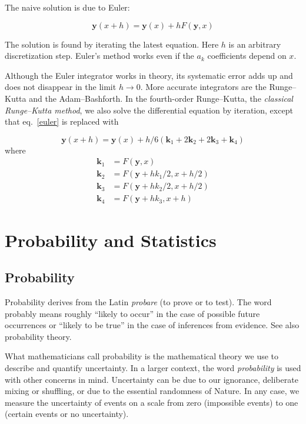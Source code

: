 \documentclass[justified,sixbynine]{tufte-book}
\theoremstyle{plain}%
\theoremstyle{definition}
\theoremstyle{remark}
\begin{document}
\begin{fullwidth}
The naive solution is due to Euler:

\begin{equation}
\mathbf{y}(x+h) = \mathbf{y}(x) + hF(\mathbf{y},x)\label{euler}
\end{equation}

The solution is found by iterating the latest equation. Here $h$ is an arbitrary discretization step. Euler's method works even if the $a_k$ coefficients depend on $x$.

 Although the Euler integrator works in theory, its systematic error adds up and does not disappear in the limit $h\rightarrow 0$. More accurate integrators are the Runge--Kutta and the Adam--Bashforth. In the fourth-order Runge--Kutta, the {\it classical Runge--Kutta method}, we also solve the differential equation by iteration, except that eq.~\ref{euler} is replaced with

\begin{equation}
\mathbf{y}(x+h) = \mathbf{y}(x) + h/6 (\mathbf{k}_1+2\mathbf{k}_2+2\mathbf{k}_3+\mathbf{k}_4)\label{rungekutta}
\end{equation}
where
\begin{align}
\mathbf{k}_1 &= F(\mathbf{y},x) \\
\mathbf{k}_2 &= F(\mathbf{y}+h k_1/2,x+h/2) \\
\mathbf{k}_3 &= F(\mathbf{y}+h k_2/2,x+h/2) \\
\mathbf{k}_4 &= F(\mathbf{y}+h k_3,x+h)
\end{align}

\chapter{Probability and Statistics}

\goodbreak\section{Probability}


Probability derives from the Latin {\it probare} (to prove or to test). The word
probably means roughly ``likely to occur'' in the case of possible future
occurrences or ``likely to be true'' in the case of inferences from
evidence. See also probability theory.

What mathematicians call probability is the mathematical theory we use to
describe and quantify uncertainty. In a larger context, the word {\it probability}
is used with other concerns in mind. Uncertainty can be due to our
ignorance, deliberate mixing or shuffling, or due to the essential
randomness of Nature. In any case, we measure the uncertainty of events on a
scale from zero (impossible events) to one (certain events or no
uncertainty).


\end{fullwidth}
\end{document}
